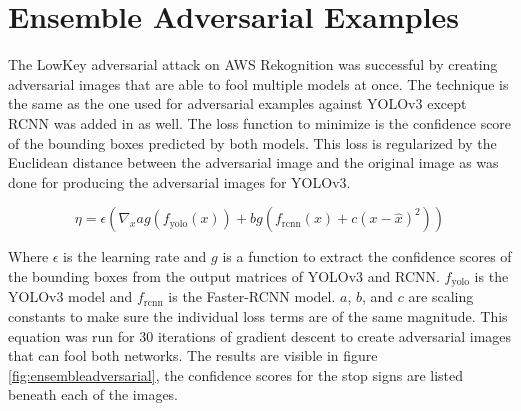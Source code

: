 \documentclass{article}
\begin{document}
\section{Ensemble Adversarial Examples}

The LowKey adversarial attack \cite{cherepanova2021lowkey} on AWS Rekognition was successful by creating adversarial images that are able to fool multiple models at once. The technique is the same as the one used for adversarial examples against YOLOv3 \cite{redmon2018yolov3} except RCNN \cite{ren2016faster} was added in as well. The loss function to minimize is the confidence score of the bounding boxes predicted by both models. This loss is regularized by the Euclidean distance between the adversarial image and the original image as was done for producing the adversarial images for YOLOv3.

\begin{equation}
    \eta = \epsilon (\nabla_x ag(f_{\text{yolo}}(x)) + bg(f_{\text{rcnn}}(x) + c(x - \hat{x})^2))
\end{equation}

Where $\epsilon$ is the learning rate and $g$ is a function to extract the confidence scores of the bounding boxes from the output matrices of YOLOv3 and RCNN. $f_{\text{yolo}}$ is the YOLOv3 model and $f_{\text{rcnn}}$ is the Faster-RCNN model. $a$, $b$, and $c$ are scaling constants to make sure the individual loss terms are of the same magnitude. This equation was run for 30 iterations of gradient descent to create adversarial images that can fool both networks. The results are visible in figure \ref{fig:ensembleadversarial}, the confidence scores for the stop signs are listed beneath each of the images.
\end{document}

